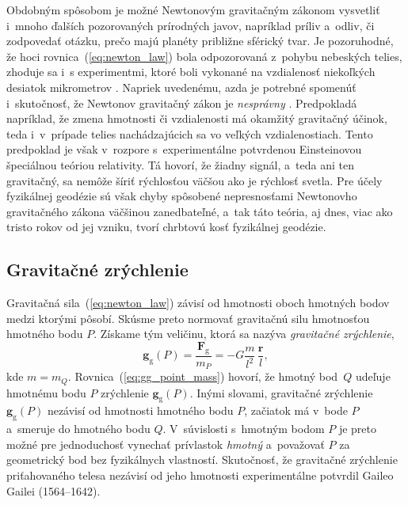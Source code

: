 \documentclass[a4paper, 12pt]{book}
\newcommand{\gidx}{\mathrm g}
\let\vec\mathbf
\begin{document}
Obdobným spôsobom je možné Newtonovým gravitačným zákonom vysvetliť i~mnoho
ďalších pozorovaných prírodných javov, napríklad príliv a~odliv, či zodpovedať
otázku, prečo majú planéty približne sférický tvar.  Je pozoruhodné, že hoci
rovnica~(\ref{eq:newton_law}) bola odpozorovaná z~pohybu nebeských telies,
zhoduje sa i~s experimentmi, ktoré boli vykonané na vzdialenosť niekoľkých
desiatok mikrometrov \citep{Lee2020}.  Napriek uvedenému, azda je potrebné
spomenúť i~skutočnosť, že Newtonov gravitačný zákon je \emph{nesprávny}
\citep{Feynman}.  Predpokladá napríklad, že zmena hmotnosti či vzdialenosti má
okamžitý gravitačný účinok, teda i~v~prípade telies nachádzajúcich sa vo
veľkých vzdialenostiach.  Tento predpoklad je však v~rozpore s~experimentálne
potvrdenou Einsteinovou špeciálnou teóriou relativity.  Tá hovorí, že žiadny
signál, a~teda ani ten gravitačný, sa nemôže šíriť rýchlosťou väčšou ako je
rýchlosť svetla.  Pre účely fyzikálnej geodézie sú však chyby spôsobené
nepresnosťami Newtonovho gravitačného zákona väčšinou zanedbateľné, a~tak táto
teória, aj dnes, viac ako tristo rokov od jej vzniku, tvorí chrbtovú kosť
fyzikálnej geodézie.






\subsection{Gravitačné zrýchlenie}
\label{sec:gg}

Gravitačná sila~(\ref{eq:newton_law}) závisí od hmotnosti oboch hmotných
bodov medzi ktorými pôsobí.  Skúsme preto normovať gravitačnú silu hmotnosťou
hmotného bodu $P$.  Získame tým veličinu, ktorá sa nazýva \emph{gravitačné
zrýchlenie},
%
\begin{equation}
\label{eq:gg_point_mass}
\vec g_\gidx(P) = \frac{\vec F_\gidx}{m_P} = -G \frac{m}{l^2} \, \frac{\vec
r}{l}{,}
\end{equation}
%
kde $m = m_Q$.  Rovnica~(\ref{eq:gg_point_mass}) hovorí, že hmotný
bod~$Q$ udeľuje hmotnému bodu $P$ zrýchlenie $\vec g_\gidx(P)$.   Inými
slovami, gravitačné zrýchlenie $\vec g_\gidx(P)$ nezávisí od hmotnosti hmotného
bodu $P$, začiatok má v~bode $P$ a~smeruje do hmotného bodu $Q$.  V~súvislosti
s~hmotným bodom $P$ je preto možné pre jednoduchosť vynechať prívlastok
\emph{hmotný} a~považovať $P$ za geometrický bod bez fyzikálnych vlastností.
Skutočnosť, že gravitačné zrýchlenie priťahovaného telesa nezávisí od jeho
hmotnosti experimentálne potvrdil Gaileo Gailei (1564--1642).
\end{document}
